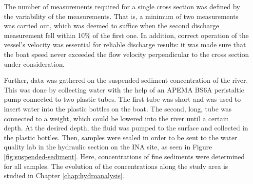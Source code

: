 The number of measurements required for a single cross section was defined by the variability of the measurements. That is, a minimum of two measurements was carried out, which was deemed to suffice when the second discharge measurement fell within 10\% of the first one. In addition, correct operation of the vessel's velocity was essential for reliable discharge results: it was made sure that the boat speed never exceeded the flow velocity perpendicular to the cross section under consideration. 


Further, data was gathered on the suspended sediment concentration of the river. This was done by collecting water with the help of an APEMA BS6A peristaltic pump connected to two plastic tubes. The first tube was short and was used to insert water into the plastic bottles on the boat. The second, long, tube was connected to a weight, which could be lowered into the river until a certain depth. At the desired depth, the fluid was pumped to the surface and collected in the plastic bottles. Then, samples were sealed in order to be sent to the water quality lab in the hydraulic section on the INA site, as seen in Figure \ref{fig:suspended-sediment}. Here, concentrations of fine sediments were determined for all samples. The evolution of the concentrations along the study area is studied in Chapter \ref{chap:hydroanalysis}.

